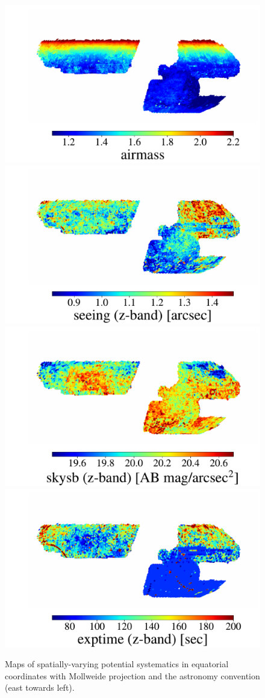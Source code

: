 \begin{figure}
\includegraphics[width=0.24\linewidth, trim={1.5cm 0 1.2cm 1.5cm},clip]{figures/systematic_maps/airmass.pdf}
\includegraphics[width=0.24\linewidth, trim={1.5cm 0 1.2cm 1.5cm},clip]{figures/systematic_maps/seeing_z.pdf}
\includegraphics[width=0.24\linewidth, trim={1.5cm 0 1.2cm 1.5cm},clip]{figures/systematic_maps/skymag_z.pdf}
\includegraphics[width=0.24\linewidth, trim={1.5cm 0 1.2cm 1.5cm},clip]{figures/systematic_maps/exptime_z.pdf}
\caption{Maps of spatially-varying potential systematics in equatorial coordinates with Mollweide projection and the astronomy convention (east towards left).}
\label{fig:systematic_maps}
\end{figure}

